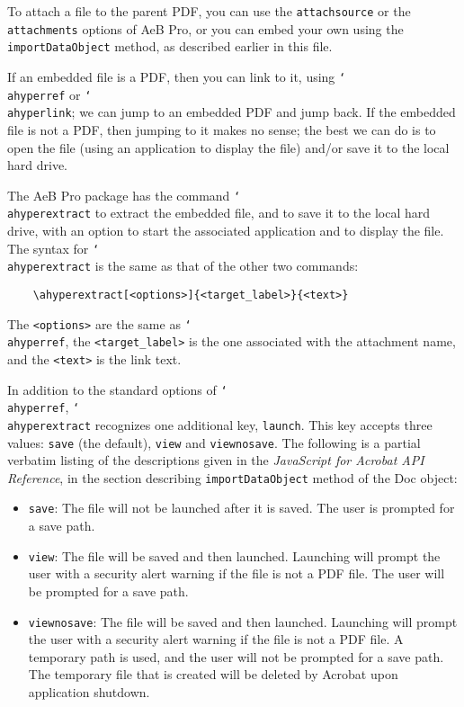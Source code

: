 \documentclass{article}
\newcommand{\cs}[1]{\texttt{\char`\\#1}}
\newcommand\newtopic{\par\ifdim\lastskip>0pt\relax\vskip-\lastskip\fi
\par\vskip6pt\noindent}
\begin{document}
To attach a file to the parent PDF, you can use the
\texttt{attachsource} or the \texttt{attachments} options of AeB
Pro, or you can embed your own using the \texttt{importDataObject}
method, as described earlier in this file.

If an embedded file is a PDF, then you can link to it, using
\cs{ahyperref} or \cs{ahyperlink}; we can jump to an embedded PDF
and jump back. If the embedded file is not a PDF, then jumping to it
makes no sense; the best we can do is to open the file (using an
application to display the file) and/or save it to the local hard
drive.

The AeB Pro package has the command \cs{ahyperextract} to extract
the embedded file, and to save it to the local hard drive, with an
option to start the associated application and to display the file.
The syntax for \cs{ahyperextract} is the same as that of the other two commands:
\begin{verbatim}
    \ahyperextract[<options>]{<target_label>}{<text>}
\end{verbatim}
\noindent The \texttt{<options>} are the same as \cs{ahyperref}, the \texttt{<target\_label>} is the one associated
with the attachment name, and the \texttt{<text>} is the link text.

\newtopic In addition to the standard options of \cs{ahyperref}, \cs{ahyperextract} recognizes one additional key, \texttt{launch}.
This key accepts three values: \texttt{save} (the default), \texttt{view} and \texttt{viewnosave}. The following is a
partial verbatim listing of the descriptions given in the \textsl{JavaScript for Acrobat API Reference}, in the section
describing \texttt{importDataObject} method of the Doc object:
\begin{itemize}
    \item \texttt{save}: The file will not be launched after it is saved. The user is prompted for a save path.
    \item \texttt{view}: The file will be saved and then launched. Launching will prompt
    the user with a security alert warning if the file is not a PDF file. The user will be
    prompted for a save path.
    \item \texttt{viewnosave}: The file will be saved and then launched. Launching will prompt
the user with a security alert warning if the file is not a PDF file. A temporary path
is used, and the user will not be prompted for a save path. The temporary file that
is created will be deleted by Acrobat upon application shutdown.
\end{itemize}
\end{document}
